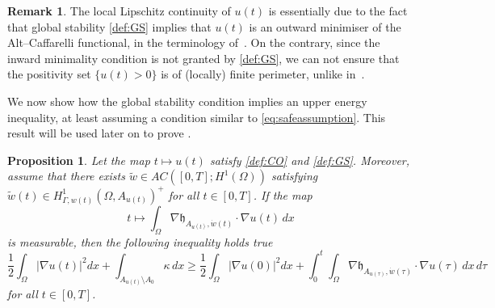 \documentclass[a4paper,11pt,reqno]{amsart}
\numberwithin{equation}{section}
\newtheorem{prop}[teo]{Proposition}
\theoremstyle{definition}
\newtheorem{remark}[teo]{Remark}
\theoremstyle{remark}
\begin{document}
\begin{remark}
    The local Lipschitz continuity of $u(t)$ is essentially due to the fact that global stability \ref{def:GS} implies that $u(t)$ is an outward minimiser of the Alt--Caffarelli functional, in the terminology of~\cite{Velichkov}. On the contrary, since the inward minimality condition is not granted by \ref{def:GS}, we can not ensure that the positivity set $\{u(t)>0\}$ is of (locally) finite perimeter, unlike in~\cite{FeldKimPoz2}.
\end{remark}

We now show how the global stability condition implies an upper energy inequality, at least assuming a condition similar to \eqref{eq:safeassumption}. This result will be used later on to prove .

\begin{prop}\label{prop:upperineq}
    Let the map $t\mapsto u(t)$ satisfy \ref{def:CO} and \ref{def:GS}. Moreover,  assume that there exists $\widetilde w\in AC([0,T];H^1(\Omega))$ satisfying $\widetilde w(t)\in H^1_{\Gamma, w(t)}(\Omega, A_{u(t)})^+$ for all $t\in [0,T]$. 
    If the map
    \begin{equation}
        \displaystyle t\mapsto \int_\Omega \nabla \mathfrak{h}_{A_{u(t)},\dot w(t)}\cdot \nabla u(t) \, dx
    \end{equation}
    is measurable, then the following inequality holds true
    \begin{equation}\label{eq:upperineq}
            \frac 12 \int_\Omega |\nabla u(t)|^2 dx+\int_{A_{u(t)}\setminus A_0}\kappa\,d x\ge   \frac 12 \int_\Omega |\nabla u(0)|^2 dx+\int_0^t \int_\Omega \nabla \mathfrak{h}_{A_{u(\tau)},\dot w(\tau)}\cdot \nabla u(\tau) \, dx\, d\tau
        \end{equation}
        for all $t\in [0,T]$.
\end{prop}
\end{document}
